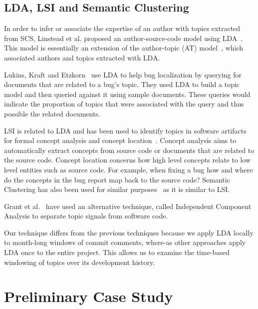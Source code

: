 \documentclass[times, 10pt,twocolumn]{article}
\newcommand{\shrinkit}{\vspace*{-.3em}}
\begin{document}
\shrinkit
\subsection{LDA, LSI and Semantic Clustering}
\shrinkit

In order to infer or associate the expertise of an author with topics
extracted from SCS, Linstead et al. proposed an author-source-code model
using LDA~\cite{10.1109/MSR.2007.20,NIPS2007637,1321709}. This model
is essentially an extension of the author-topic (AT)
model~\cite{1036902}, which associated authors and topics extracted
with LDA.

Lukins, Kraft and Etzkorn~\cite{lukins2008} use LDA to help bug
localization by querying for documents that are related to a bug's topic. They
used LDA to build a topic model and then queried against it using
sample documents. These queries would indicate the proportion of
topics that were associated with the query and thus possible the
related documents.

LSI is related to LDA and has been used to identify topics in software
artifacts for formal concept analysis and concept
location~\cite{1421013,1374321,10.1109/ICPC.2007.13,10.1109/ICPC.2006.17}.
Concept analysis aims to automatically extract concepts from source
code or documents that are related to the source code.  Concept location concerns how
high level concepts relate to low level entities such as source code. For
example, when fixing a bug how and where do the concepts in the bug
report map back to the source code?  Semantic Clustering has also been
used for similar purposes~\cite{1698774,1566153} as it is similar to
LSI.

Grant et al.~\cite{scottcordy} have used an alternative technique,
 called Independent Component Analysis to
separate topic signals from software code. 

Our technique differs from the previous techniques because we apply
LDA locally to month-long windows of commit comments, where-as other
approaches apply LDA once to the entire project. This allows us to
examine the time-based windowing of topics over its development
history.



\shrinkit
\section{Preliminary Case Study}
\shrinkit
\end{document}
